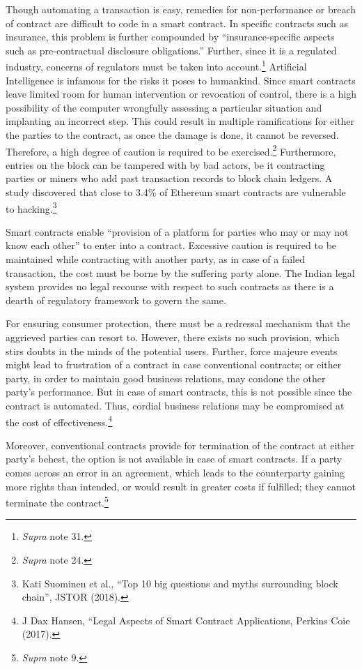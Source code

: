 \begin{multicols}{2}
\noi
Though automating a transaction is easy, remedies for non-performance or breach of contract
are difficult to code in a smart contract. In specific contracts such as insurance, this problem
is further compounded by “insurance-specific aspects such as pre-contractual disclosure
obligations.” Further, since it is a regulated industry, concerns of regulators must be taken
into account.\footnote{\textit{Supra} note 31.} Artificial Intelligence is infamous for the risks it poses to humankind. Since
smart contracts leave limited room for human intervention or revocation of control, there is a
high possibility of the computer wrongfully assessing a particular situation and implanting an
incorrect step. This could result in multiple ramifications for either the parties to the contract,
as once the damage is done, it cannot be reversed. Therefore, a high degree of caution is
required to be exercised.\footnote{\textit{Supra} note 24.} Furthermore, entries on the block can be tampered with by bad
actors, be it contracting parties or miners who add past transaction records to block chain
ledgers. A study discovered that close to 3.4\% of Ethereum smart contracts are vulnerable to
hacking.\footnote{Kati Suominen et al., “Top 10 big questions and myths surrounding block chain”, JSTOR (2018).}

\noi
Smart contracts enable “provision of a platform for parties who may or may not know each
other” to enter into a contract. Excessive caution is required to be maintained while
contracting with another party, as in case of a failed transaction, the cost must be borne by the suffering party alone. The Indian legal system provides no legal recourse with respect to such
contracts as there is a dearth of regulatory framework to govern the same. 

\noi
For ensuring consumer protection, there must be a redressal mechanism that the aggrieved
parties can resort to. However, there exists no such provision, which stirs doubts in the minds
of the potential users. Further, force majeure events might lead to frustration of a contract in
case conventional contracts; or either party, in order to maintain good business relations, may
condone the other party’s performance. But in case of smart contracts, this is not possible
since the contract is automated. Thus, cordial business relations may be compromised at the
cost of effectiveness.\footnote{J Dax Hansen, “Legal Aspects of Smart Contract Applications, Perkins Coie (2017).}

\noi
Moreover, conventional contracts provide for termination of the contract at either party’s
behest, the option is not available in case of smart contracts. If a party comes across an error
in an agreement, which leads to the counterparty gaining more rights than intended, or would
result in greater costs if fulfilled; they cannot terminate the contract.\footnote{\textit{Supra} note 9.}


\end{multicols}
